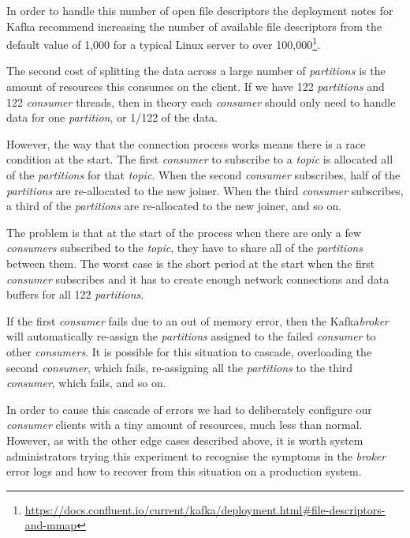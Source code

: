 \documentclass{article}
\newcommand{\kafka} {Kafka\xspace}
\newcommand{\kftopic} {\textit{topic}\xspace}
\newcommand{\kfbroker} {\textit{broker}\xspace}
\newcommand{\kfconsumer} {\textit{consumer}\xspace}
\newcommand{\kfconsumers} {\textit{consumers}\xspace}
\newcommand{\kfpartition} {\textit{partition}\xspace}
\newcommand{\kfpartitions} {\textit{partitions}\xspace}
\newcommand{\footurl}[1] {\footnote{\url{#1}}}
\begin{document}
In order to handle this number of open file descriptors the deployment notes for \kafka recommend increasing the number of available file descriptors from the default value of 1,000 for a typical Linux server to over 100,000\footurl{https://docs.confluent.io/current/kafka/deployment.html#file-descriptors-and-mmap}.

The second cost of splitting the data across a large number of \kfpartitions is the amount of resources this consumes on the client.
If we have 122 \kfpartitions and 122 \kfconsumer threads, then in theory each \kfconsumer should only need to handle data for one \kfpartition, or 1/122 of the data.

However, the way that the connection process works means there is a race condition at the start.
The first \kfconsumer to subscribe to a \kftopic is allocated all of the \kfpartitions for that \kftopic.
When the second \kfconsumer subscribes, half of the \kfpartitions are re-allocated to the new joiner.
When the third \kfconsumer subscribes, a third of the \kfpartitions are re-allocated to the new joiner, and so on.

The problem is that at the start of the process when there are only a few \kfconsumers subscribed to the \kftopic, they have to share all of the \kfpartitions between them.
The worst case is the short period at the start when the first \kfconsumer subscribes and it has to create enough network connections and data buffers for all 122 \kfpartitions.

If the first \kfconsumer fails due to an out of memory error, then the \kafka \kfbroker will automatically re-assign the \kfpartitions assigned to the failed \kfconsumer to other \kfconsumers. It is possible for this situation to cascade, overloading the second \kfconsumer, which fails, re-assigning all the \kfpartitions to the third \kfconsumer, which fails, and so on.

In order to cause this cascade of errors we had to deliberately configure our \kfconsumer clients with a tiny amount of resources, much less than normal.
However, as with the other edge cases described above, it is worth system administrators trying this experiment to recognise the symptoms in the \kfbroker error logs and how to recover from this situation on a production system.

\printbibliography
\end{document}
